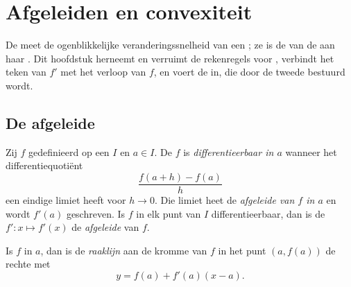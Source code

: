 \chapter{Afgeleiden en convexiteit}\label{ch:g12:deriv}

De  meet de ogenblikkelijke veranderingssnelheid van een ; ze
is de  van de  aan haar . Dit hoofdstuk
herneemt en verruimt de rekenregels voor , verbindt het teken van
$f'$ met het verloop van $f$, en voert de  in, die door de tweede
 bestuurd wordt.

\section{De afgeleide}

\begin{definition}\label{def:g12:deriv:derivative}
Zij $f$ gedefinieerd op een  $I$ en $a \in I$. De  $f$ is
\emph{differentieerbaar in $a$}
wanneer het differentiequotiënt
\[
\frac{f(a+h) - f(a)}{h}
\]
een eindige limiet heeft voor $h \to 0$. Die limiet heet de \emph{afgeleide
van $f$ in $a$} en wordt $f'(a)$ geschreven. Is $f$ in elk punt van $I$
differentieerbaar, dan is de  $f' \colon x \mapsto f'(x)$ de
\emph{afgeleide} van $f$.
\end{definition}

\begin{definition}[Raaklijn]\label{def:g12:deriv:tangent}
Is $f$  in $a$, dan is de \emph{raaklijn}
aan de kromme van $f$ in het punt $(a, f(a))$ de rechte met 
\[
y = f(a) + f'(a)(x - a).
\]
\end{definition}

